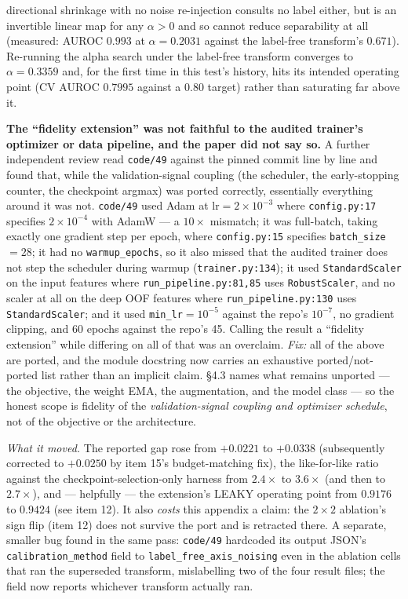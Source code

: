 \documentclass[10pt]{article} %
\begin{document}
\begin{description}
  directional shrinkage with no noise re-injection consults no label
  either, but is an invertible linear map for any $\alpha>0$ and so
  cannot reduce separability at all (measured: AUROC $0.993$ at
  $\alpha=0.2031$ against the label-free transform's $0.671$). Re-running
  the alpha search under the label-free transform converges to
  $\alpha=0.3359$ and, for the first time in this test's history, hits
  its intended operating point (CV AUROC $0.7995$ against a $0.80$
  target) rather than saturating far above it.
\item[14.] \textbf{The ``fidelity extension'' was not faithful to the audited
  trainer's optimizer or data pipeline, and the paper did not say so.} A
  further independent review read \texttt{code/49} against the pinned commit
  line by line and found that, while the validation-signal coupling (the
  scheduler, the early-stopping counter, the checkpoint argmax) was ported
  correctly, essentially everything around it was not. \texttt{code/49} used
  Adam at $\text{lr}=2\times10^{-3}$ where \texttt{config.py:17} specifies
  $2\times10^{-4}$ with AdamW --- a $10\times$ mismatch; it was full-batch,
  taking exactly one gradient step per epoch, where \texttt{config.py:15}
  specifies \texttt{batch\_size}$=28$; it had no \texttt{warmup\_epochs}, so
  it also missed that the audited trainer does not step the scheduler during
  warmup (\texttt{trainer.py:134}); it used \texttt{StandardScaler} on the
  input features where \texttt{run\_pipeline.py:81,85} uses
  \texttt{RobustScaler}, and no scaler at all on the deep OOF features where
  \texttt{run\_pipeline.py:130} uses \texttt{StandardScaler}; and it used
  \texttt{min\_lr}$=10^{-5}$ against the repo's $10^{-7}$, no gradient
  clipping, and 60 epochs against the repo's 45. Calling the result a
  ``fidelity extension'' while differing on all of that was an overclaim.
  \textit{Fix:} all of the above are ported, and the module docstring now
  carries an exhaustive ported/not-ported list rather than an implicit claim.
  §4.3 names what remains unported --- the objective, the weight EMA, the
  augmentation, and the model class --- so the honest scope is fidelity of the
  \emph{validation-signal coupling and optimizer schedule}, not of the
  objective or the architecture.

  \textit{What it moved.} The reported gap rose from $+0.0221$ to
  $+0.0338$ (subsequently corrected to $\mathbf{+0.0250}$ by item 15's
  budget-matching fix), the like-for-like ratio against the
  checkpoint-selection-only harness from $2.4\times$ to $3.6\times$ (and then
  to $2.7\times$), and ---
  helpfully --- the extension's LEAKY operating point from $0.9176$ to
  $0.9424$ (see item 12). It also \emph{costs} this appendix a claim: the
  $2\times2$ ablation's sign flip (item 12) does not survive the port and is
  retracted there. A separate,
  smaller bug found in the same pass: \texttt{code/49} hardcoded its output
  JSON's \texttt{calibration\_method} field to
  \texttt{label\_free\_axis\_noising} even in the ablation cells that ran the
  superseded transform, mislabelling two of the four result files; the field
  now reports whichever transform actually ran.


\end{description}
\end{document}
